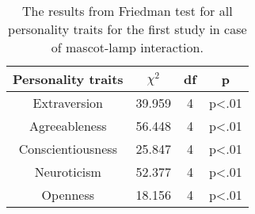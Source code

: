 \begin{table}[!htb]
    \renewcommand{\arraystretch}{1}
    \begin{center}
        \begin{tabular}{|c|c|c|c|}
            \hline
            \textbf{Personality traits} & \textbf{$\chi^2$} & \textbf{df} & \textbf{p} \\
            \hline
            Extraversion &39.959 &4 & p<.01 \\
            \hline
            Agreeableness &56.448 &4 & p<.01 \\
            \hline
            Conscientiousness &25.847 &4 & p<.01\\
            \hline
            Neuroticism &52.377 &4 & p<.01 \\
            \hline
            Openness &18.156 &4 & p<.01 \\
            \hline
        \end{tabular}
        \caption{The results from Friedman test for all personality traits for the first study
        in case of mascot-lamp interaction.}
        \label{table:friedmanML1}
    \end{center}
\end{table}

